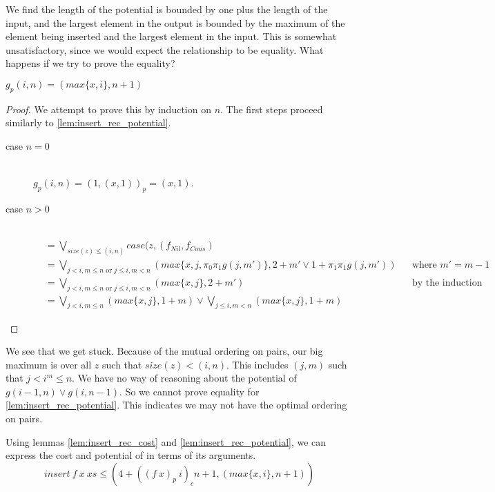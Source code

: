 We find the length of the potential is bounded by one plus the length of the input,
  and the largest element in the output is bounded by the maximum of the element being inserted and the
  largest element in the input.
This is somewhat unsatisfactory, since we would expect the relationship to be equality.
What happens if we try to prove the equality?
\begin{lemma}
  \label{lem:insert_rec_potential_wrong}
  $g_p(i,n) = (max\{x, i\}, n+1)$
\end{lemma}
\begin{proof}
  We attempt to prove this by induction on $n$.
  The first steps proceed similarly to \ref{lem:insert_rec_potential}.
  \begin{description}
    \item[case $n=0$]\hfill \\
      $g_p(i,n) = (1, (x, 1))_p = (x, 1)$.
    \item[case $n>0$]\hfill \\
      \begin{align*}
        &= \bigvee_{size(z) \leq (i,n)} case(z, (f_{Nil}, f_{Cons}) &&\\
        &= \bigvee_{j < i, m \leq n \text{ or } j \leq i, m < n} (max\{x, j, \pi_0\pi_1g(j, m')\}, 2 + m' \vee 1 + \pi_1\pi_1g(j, m')) && \text{where $m' = m - 1$}\\
        &= \bigvee_{j < i, m \leq n \text{ or } j \leq i, m < n} (max\{x, j\}, 2 + m')&&\text{by the induction hypothesis}\\
        &= \bigvee_{j < i, m \leq n} (max\{x, j\}, 1 + m) \vee \bigvee_{j \leq i, m < n} (max\{x, j\}, 1 + m)&&
      \end{align*}
  \end{description}
\end{proof}

We see that we get stuck.
Because of the mutual ordering on pairs, our big maximum is over all $z$ such that $size(z) < (i, n)$.
This includes $(j, m)$ such that $j < i ^ m \leq n$.
We have no way of reasoning about the potential of $g(i-1, n) \vee g(i, n -1)$.
So we cannot prove equality for \ref{lem:insert_rec_potential}.
This indicates we may not have the optimal ordering on pairs.

Using lemmas \ref{lem:insert_rec_cost} and \ref{lem:insert_rec_potential}, we can express the cost and potential of  in terms of its arguments.
\begin{equation}
  \label{eq:insert_interp}
  insert\ f\ x\ xs \leq (4 + ((f\ x)_p\ i)_c n + 1, (max\{x, i\}, n+1))
\end{equation}


